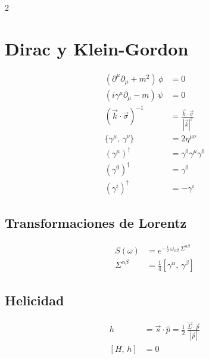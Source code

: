 \documentclass[a4paper, 12pt]{article}
\begin{document}
\begin{multicols}{2}
\section*{Dirac y Klein-Gordon}

\begin{align*}
    (\partial^{\mu}\partial_{\mu} + m^{2})\,\phi
        &= 0                                                           \\
    (i\gamma^{\mu}\partial_{\mu} - m)\,\psi
        &= 0                                                           \\
    (\vec{k}\cdot\vec{\sigma})^{-1}
        &= \frac{\vec{k}\cdot\vec{\sigma}}{|\vec{k}|^{2}}             \\
    \{\gamma^{\mu},\, \gamma^{\nu}\}
        &= 2\eta^{\mu\nu}                                              \\
    (\gamma^{\mu})^{\dagger}
        &= \gamma^{0}\gamma^{\mu}\gamma^{0}                           \\
    (\gamma^{0})^{\dagger}
        &= \gamma^{0}                                                  \\
    (\gamma^{i})^{\dagger}
        &= -\gamma^{i}
\end{align*}


\subsection*{Transformaciones de Lorentz}
\begin{align*}
    S(\omega)
        &= e^{-\frac{i}{2}\,\omega_{\alpha\beta}\,\Sigma^{\alpha\beta}} \\
    \Sigma^{\alpha\beta}
        &= \frac{1}{4}\!\left[\gamma^{\alpha},\, \gamma^{\beta}\right]
\end{align*}

\subsection*{Helicidad}
\begin{align*}
    h   &= \vec{s}\cdot\hat{p}
          = \frac{1}{2}\,\frac{\vec{\Sigma}\cdot\vec{p}}{|\vec{p}|}  \\
    [H,\, h] &= 0
\end{align*}


\end{multicols}
\end{document}
